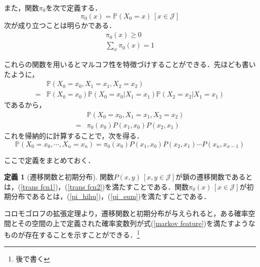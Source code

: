 \documentclass[12pt, a4paper]{jsarticle}
\theoremstyle{definition}
\newtheorem{defn}{定義}[section]
\begin{document}
また，関数$\pi_0$を次で定義する．
\begin{equation}
	\pi_0(x) = \mathbb{P}(X_0 = x ) \, [x \in \mathcal{J}]
\end{equation}
次が成り立つことは明らかである．
\begin{align}
	\pi_0(x) \ge 0 \label{pi_hihu}  \\
	\sum_x \pi_0(x) = 1 \label{pi_sum} 
\end{align}

これらの関数を用いるとマルコフ性を特徴づけすることができる．先ほども書いたように，
\begin{align*}
	& \mathbb{P}(X_0 = x_0 , X_1 = x_1, X_2 = x_2) \\
	=&\mathbb{P}(X_0 = x_0)\mathbb{P}(X_0 = x_0| X_1 = x_1)\mathbb{P}(X_2 = x_2 | X_1 = x_1)
\end{align*}
であるから，
\begin{align*}
	& \mathbb{P}(X_0 = x_0 , X_1 = x_1, X_2 = x_2) \\
	=& \pi_0(x_0) P(x_1,x_0)P(x_2,x_1)
\end{align*}
これを帰納的に計算することで，次を得る．
\begin{equation}
\mathbb{P}(X_0 = x_0 , \cdots , X_n = x_n) = \pi_0(x_0) P(x_1,x_0)P(x_2,x_1)\cdots P(x_n,x_{x-1}) \label{markov feature} 
\end{equation}

ここで定義をまとめておく．
\begin{screen}
	\begin{defn}[遷移関数と初期分布]
		関数$P(x,y)\,[x,y \in \mathcal{J}]$が鎖の遷移関数であるとは，(\ref{trans fcn1})，(\ref{trans fcn2})を満たすことである．関数$\pi_0(x)\, [x \in \mathcal{J}]$が初期分布であるとは，(\ref{pi_hihu})，(\ref{pi_sum})を満たすことである．
	\end{defn}
\end{screen}

コロモゴロフの拡張定理より，遷移関数と初期分布が与えられると，ある確率空間とその空間の上で定義された確率変数列が式(\ref{markov feature})を満たすようなものが存在することを示すことができる．\footnote{後で書く}
\end{document}
